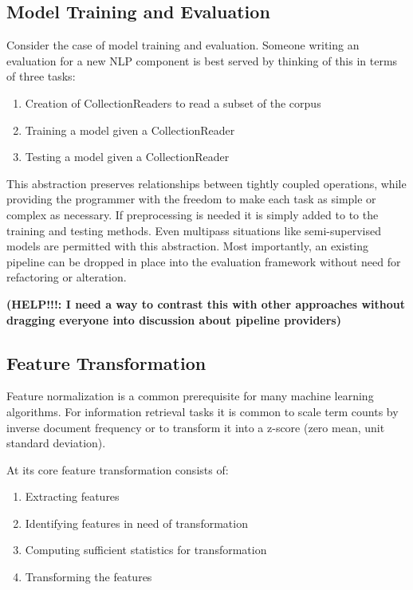 \documentclass[10pt, a4paper]{article}
\begin{document}
\subsection{Model Training and Evaluation}
Consider the case of model training and evaluation.  Someone writing an evaluation for a new NLP component is best served by thinking of this in terms of three tasks:

\begin{enumerate}
\item Creation of CollectionReaders to read a subset of the corpus
\item Training a model given a CollectionReader
\item Testing a model given a CollectionReader
\end{enumerate}


This abstraction preserves relationships between tightly coupled operations, while providing the programmer with the freedom to make each task as simple or complex as necessary.  If preprocessing is needed it is simply added to to the training and testing methods.  Even multipass situations like semi-supervised models are permitted with this abstraction.  Most importantly, an existing pipeline can be dropped in place into the evaluation framework without need for refactoring or alteration.

\textbf{(HELP!!!: I need a way to contrast this with other approaches without dragging everyone into discussion about pipeline providers)}

%

\subsection{Feature Transformation}

Feature normalization is a common prerequisite for many machine learning algorithms.  For information retrieval tasks it is common to scale term counts by inverse document frequency or to transform it into a z-score (zero mean, unit standard deviation).

At its core feature transformation consists of:
\begin{enumerate}
\item Extracting features
\item Identifying features in need of transformation
\item Computing sufficient statistics for transformation
\item Transforming the features
\end{enumerate}
\end{document}
